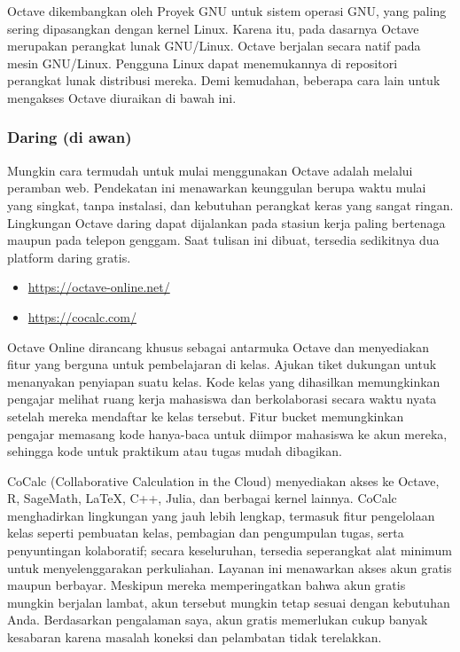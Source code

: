 
Octave dikembangkan oleh Proyek GNU untuk sistem operasi GNU, yang
paling sering dipasangkan dengan kernel Linux. Karena itu, pada dasarnya
Octave merupakan perangkat lunak GNU/Linux. Octave berjalan secara
natif pada mesin GNU/Linux. Pengguna Linux dapat menemukannya di repositori
perangkat lunak distribusi mereka. Demi kemudahan, beberapa cara lain
untuk mengakses Octave diuraikan di bawah ini.

\subsubsection*{Daring (di awan)}

Mungkin cara termudah untuk mulai menggunakan Octave adalah melalui
peramban web. Pendekatan ini menawarkan keunggulan berupa waktu mulai
yang singkat, tanpa instalasi, dan kebutuhan perangkat keras yang
sangat ringan. Lingkungan Octave daring dapat dijalankan pada stasiun
kerja paling bertenaga maupun pada telepon genggam. Saat tulisan ini
dibuat, tersedia sedikitnya dua platform daring gratis.
\begin{itemize}
\item \href{https://octave-online.net/}{https://octave-online.net/} 
\item \href{https://cocalc.com/}{https://cocalc.com/}
\end{itemize}
Octave Online dirancang khusus sebagai antarmuka Octave dan menyediakan
fitur yang berguna untuk pembelajaran di kelas. Ajukan tiket dukungan
untuk menanyakan penyiapan suatu kelas. Kode kelas yang dihasilkan
memungkinkan pengajar melihat ruang kerja mahasiswa dan berkolaborasi
secara waktu nyata setelah mereka mendaftar ke kelas tersebut. Fitur
bucket memungkinkan pengajar memasang kode hanya-baca untuk diimpor
mahasiswa ke akun mereka, sehingga kode untuk praktikum atau tugas
mudah dibagikan.

CoCalc (Collaborative Calculation in the Cloud) menyediakan akses
ke Octave, R, SageMath, \LaTeX , C++, Julia, dan berbagai kernel lainnya.
CoCalc menghadirkan lingkungan yang jauh lebih lengkap, termasuk fitur
pengelolaan kelas seperti pembuatan kelas, pembagian dan pengumpulan
tugas, serta penyuntingan kolaboratif; secara keseluruhan, tersedia
seperangkat alat minimum untuk menyelenggarakan perkuliahan. Layanan
ini menawarkan akses akun gratis maupun berbayar. Meskipun mereka
memperingatkan bahwa akun gratis mungkin berjalan lambat, akun tersebut
mungkin tetap sesuai dengan kebutuhan Anda. Berdasarkan pengalaman
saya, akun gratis memerlukan cukup banyak kesabaran karena masalah
koneksi dan pelambatan tidak terelakkan.

